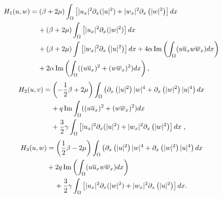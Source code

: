 \documentclass[reqno]{amsart}
\numberwithin{equation}{section}
\begin{document}
\begin{align*}
H_{1}(u,w)  &  =\left(  \beta+2\mu\right)  \int_{\Omega}\left[ |
u_{x}| ^{2}\partial_{x}(| u| ^{2})+| w_{x}| ^{2}\partial_{x}\left(
| w| ^{2}\right)
\right]  dx\\
& \hspace{0.4cm} +\left(  \beta+2\mu\right)  \int_{\Omega}\left[  | u_{x}| ^{2}\partial_{x}(| w| ^{2})\right]  dx\\
& \hspace{0.4cm} +\left(  \beta+2\mu\right)  \int\left[  | w_{x}|
^{2}\partial_{x}\left(  | u| ^{2}\right)  \right]
dx+4\alpha\operatorname{Im}\left(  \int_{\Omega}(u\overline{u}_{x}w\overline{w}_{x})dx\right) \\
&\hspace{0.4cm}  +2\alpha\operatorname{Im}\left(  \int_{\Omega}((u\overline{u}_{x})^{2}+(w\overline{w}_{x})^{2})dx\right)  \text{,}\end{align*}\begin{align*}
H_{2}(u,v)  &  =\left(  -\frac{1}{2}\beta+2\mu\right)
\int_{\Omega}\left(
\partial_{x}\left(  | u| ^{2}\right)  |
w| ^{4}+\partial_{x}\left(  | w| ^{2}\right)
| u| ^{4}\right)  dx\\
& \hspace{0.4cm} +q\operatorname{Im}\int_{\Omega}((u\overline{u}_{x})^{2}+(w\overline{w}_{x})^{2})dx\\
& \hspace{0.4cm} +\frac{3}{2}\gamma\int_{\Omega}\left[  | u_{x}|
^{2}\partial_{x}(| u| ^{2})+| w_{x}| ^{2}\partial_{x}\left( | w|
^{2}\right)  \right]  dx\text{
,}\end{align*}\begin{equation*}
\begin{split}
H_{3}(u,w)  &  =\left(  \frac{1}{2}\beta-2\mu\right)
\int_{\Omega}\left(
\partial_{x}\left(
| u| ^{2}\right)  | w| ^{4}+\partial_{x}\left(  | w| ^{2}\right) |
u| ^{4}\right)
dx\\
&+2q\operatorname{Im}\left(
\int_{\Omega}(u\overline{u}_{x}w\overline{w}_{x})dx\right) \\
& \hspace{0.4cm} +\frac{3}{2}\gamma\int_{\Omega}\left[  | u_{x}|
^{2}\partial_{x}(| w| ^{2})+| w_{x}| ^{2}\partial_{x}\left( | u|
^{2}\right)  \right] dx\text{.}
\end{split}
\end{equation*}
\end{document}
